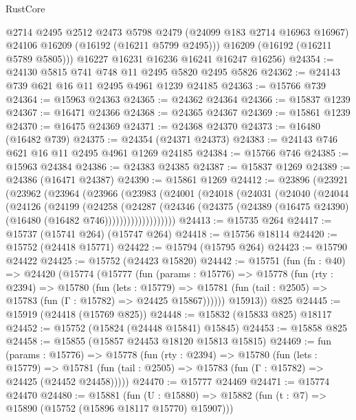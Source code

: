 \begin{lexlean}{RustCore}
\begin{coremodule}
          @2714
          @2495
          @2512
          @2473
          @5798
          @2479
          (@24099 @183 @2714 @16963 @16967)
          @24106
          @16209
          (@16192 (@16211 @5799 @2495)))
        @16209
        (@16192 (@16211 @5789 @5805)))
      @16227
      @16231
      @16236
      @16241
      @16247
      @16256)
@24354 := @24130 @5815 @741 @748 @11 @2495 @5820 @2495 @5826
@24362 := @24143 @739 @621 @16 @11 @2495 @4961 @1239 @24185
@24363 := @15766 @739
@24364 := @15963 @24363
@24365 := @24362 @24364
@24366 := @15837 @1239
@24367 := @16471 @24366
@24368 := @24365 @24367
@24369 := @15861 @1239
@24370 := @16475 @24369
@24371 := @24368 @24370
@24373 := @16480 (@16482 @739)
@24375 := @24354 (@24371 @24373)
@24383 := @24143 @746 @621 @16 @11 @2495 @4961 @1269 @24185
@24384 := @15766 @746
@24385 := @15963 @24384
@24386 := @24383 @24385
@24387 := @15837 @1269
@24389 := @24386 (@16471 @24387)
@24390 := @15861 @1269
@24412 := @23896
    (@23921
      (@23962
        (@23964
          (@23966
            (@23983
              (@24001
                (@24018
                  (@24031
                    (@24040
                      (@24044
                        (@24126
                          (@24199
                            (@24258
                              (@24287
                                (@24346
                                  (@24375
                                    (@24389 (@16475 @24390) (@16480 (@16482 @746)))))))))))))))))))
@24413 := @15735 @264
@24417 := @15737 (@15741 @264) (@15747 @264)
@24418 := @15756 @18114
@24420 := @15752 (@24418 @15771)
@24422 := @15794 (@15795 @264)
@24423 := @15790 @24422
@24425 := @15752 (@24423 @15820)
@24442 := @15751
    (fun (fn : @40) =>
    @24420
      (@15774
        (@15777
          (fun (params : @15776) =>
          @15778
            (fun (rty : @2394) =>
            @15780
              (fun (lets : @15779) =>
              @15781 (fun (tail : @2505) => @15783 (fun (Γ : @15782) => @24425 @15867))))))
        @15913))
    @825
@24445 := @15919 (@24418 (@15769 @825))
@24448 := @15832 (@15833 @825) @18117
@24452 := @15752 (@15824 (@24448 @15841) @15845)
@24453 := @15858 @825
@24458 := @15855 (@15857 @24453 @18120 @15813 @15815)
@24469 := fun (params : @15776) =>
  @15778
    (fun (rty : @2394) =>
    @15780
      (fun (lets : @15779) =>
      @15781 (fun (tail : @2505) => @15783 (fun (Γ : @15782) => @24425 (@24452 @24458)))))
@24470 := @15777 @24469
@24471 := @15774 @24470
@24480 := @15881
    (fun (U : @15880) => @15882 (fun (t : @7) => @15890 (@15752 (@15896 @18117 @15770) @15907)))

\end{coremodule}
\end{lexlean}
